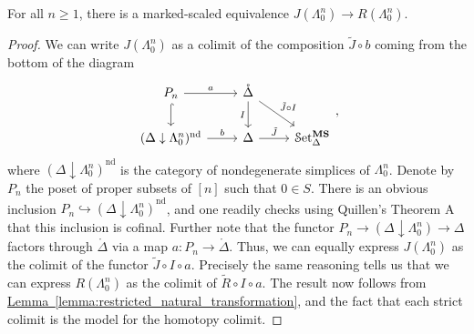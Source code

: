 \documentclass[main.tex]{subfiles}
\begin{document}
\begin{lemma}
  \label{lemma:marked_scaled_equivalence_left_horn}
  For all $n \geq 1$, there is a marked-scaled equivalence $J(\Lambda^{n}_{0}) \to R(\Lambda^{n}_{0})$.
\end{lemma}
\begin{proof}
  We can write $J(\Lambda^{n}_{0})$ as a colimit of the composition $\tilde{J} \circ b$ coming from the bottom of the diagram
  \begin{equation*}
    \begin{tikzcd}
      P_{n}
      \arrow[d, hook]
      \arrow[r, "a"]
      & \mathring{\Delta}
      \arrow[d, swap, "I"]
      \arrow[dr, "\tilde{J} \circ I"]
      \\
      (\Delta \downarrow \Lambda^{n}_{0})^{\mathrm{nd}}
      \arrow[r, "b"]
      & \Delta
      \arrow[r, "\tilde{J}"]
      &\SSetms
    \end{tikzcd},
  \end{equation*}
  where $(\Delta \downarrow \Lambda^{n}_{0})^{\mathrm{nd}}$ is the category of nondegenerate simplices of $\Lambda^{n}_{0}$. Denote by $P_{n}$ the poset of proper subsets of $[n]$ such that $0 \in S$. There is an obvious inclusion $P_{n} \hookrightarrow (\Delta \downarrow \Lambda^{n}_{0})^{\mathrm{nd}}$, and one readily checks using Quillen's Theorem A that this inclusion is cofinal. Further note that the functor $P_{n} \to (\Delta \downarrow \Lambda^{n}_{0}) \to \Delta$ factors through $\mathring{\Delta}$ via a map $a\colon P_{n} \to \mathring{\Delta}$. Thus, we can equally express $J(\Lambda^{n}_{0})$ as the colimit of the functor $\tilde{J} \circ I \circ a$. Precisely the same reasoning tells us that we can express $R(\Lambda^{n}_{0})$ as the colimit of $\tilde{R} \circ I \circ a$. The result now follows from \hyperref[lemma:restricted_natural_transformation]{Lemma~\ref*{lemma:restricted_natural_transformation}}, and the fact that each strict colimit is the model for the homotopy colimit.
\end{proof}
\end{document}
